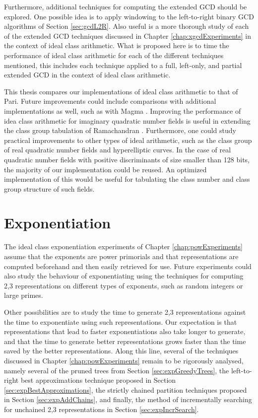 \documentclass{ucalgthes1}
\theoremstyle{definition}
\begin{document}
Furthermore, additional techniques for computing the extended GCD should be explored.  One possible idea is to apply windowing to the left-to-right binary GCD algorithms of Section \ref{sec:gcdL2R}.  Also useful is a more thorough study of each of the extended GCD techniques discussed in Chapter \ref{chap:xgcdExperiments} in the context of ideal class arithmetic.  What is proposed here is to time the performance of ideal class arithmetic for each of the different techniques mentioned, this includes each technique applied to a full, left-only, and partial extended GCD in the context of ideal class arithmetic.

This thesis compares our implementations of ideal class arithmetic to that of Pari.  Future improvements could include comparisons with additional implementations as well, such as with Magma \cite{Magma}.  Improving the performance of idea class arithmetic for imaginary quadratic number fields is useful in extending the class group tabulation of Ramachandran \cite{Ramachandran2006}.  Furthermore, one could study practical improvements to other types of ideal arithmetic, such as the class group of real quadratic number fields and hyperelliptic curves.  In the case of real quadratic number fields with positive discriminants of size smaller than 128 bits, the majority of our implementation could be reused.  An optimized implementation of this would be useful for tabulating the class number and class group structure of such fields.

\section{Exponentiation}
\label{sec:futureExponentiation}

The ideal class exponentiation experiments of Chapter \ref{chap:powExperiments} assume that the exponents are power primorials and that representations are computed beforehand and then easily retrieved for use.  Future experiments could also study the behaviour of exponentiating using the techniques for computing 2,3 representations on different types of exponents, such as random integers or large primes.

Other possibilities are to study the time to generate 2,3 representations against the time to exponentiate using such representations.  Our expectation is that representations that lead to faster exponentiations also take longer to generate, and that the time to generate better representations grows faster than the time saved by the better representations.  Along this line, several of the techniques discussed in Chapter \ref{chap:powExperiments} remain to be rigorously analysed, namely several of the pruned trees from Section \ref{sec:expGreedyTrees}, the left-to-right best approximations technique proposed in Section \ref{sec:expBestApproximations}, the strictly chained partition techniques proposed in Section \ref{sec:expAddChains}, and finally, the method of incrementally searching for unchained 2,3 representations in Section \ref{sec:expIncrSearch}.
\end{document}
